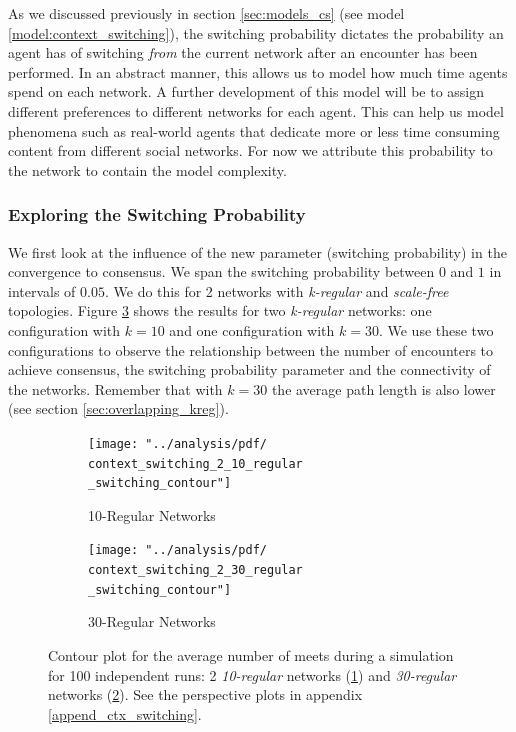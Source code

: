 \documentclass[preprint,number]{elsarticle}
\begin{document}
As we discussed previously in section \ref{sec:models_cs} (see model \ref{model:context_switching}), the switching probability dictates the probability an agent has of switching \textit{from} the current network after an encounter has been performed. In an abstract manner, this allows us to model how much time agents spend on each network. A further development of this model will be to assign different preferences to different networks for each agent. This can help us model phenomena such as real-world agents that dedicate more or less time consuming content from different social networks. For now we attribute this probability to the network to contain the model complexity.


\subsubsection{Exploring the Switching Probability}
We first look at the influence of the new parameter (switching probability) in the convergence to consensus. We span the switching probability between $0$ and $1$ in intervals of $0.05$. We do this for 2 networks with \textit{k-regular} and \textit{scale-free} topologies. Figure \ref{fig:ctx_cs_2_kregular} shows the results for two \textit{k-regular} networks: one configuration with $k = 10$ and one configuration with $k = 30$. We use these two configurations to observe the relationship between the number of encounters to achieve consensus, the switching probability parameter and the connectivity of the networks. Remember that with $k=30$ the average path length is also lower (see section \ref{sec:overlapping_kreg}). 

\begin{figure}[H]
	\centering
	\begin{subfigure}{0.49\linewidth}
		\centering
		\texttt{[image: "../analysis/pdf/  context\_switching\_2\_10\_regular \_switching\_contour"]}
		\caption{10-Regular Networks}
		\label{fig:ctx_cs_2_10kreg}
	\end{subfigure}%
	\begin{subfigure}{0.49\linewidth}
		\centering
		\texttt{[image: "../analysis/pdf/  context\_switching\_2\_30\_regular \_switching\_contour"]}
		\caption{30-Regular Networks}
		\label{fig:ctx_cs_2_30kreg}
	\end{subfigure}
	
	\begin{minipage}{0.9\linewidth}
		\vspace{0.2cm}
		\caption{Contour plot for the average number of meets during a simulation for 100 independent runs: 2 \textit{10-regular} networks (\ref{fig:ctx_cs_2_10kreg}) and \textit{30-regular} networks (\ref{fig:ctx_cs_2_30kreg}). See the perspective plots in appendix \ref{append_ctx_switching}.}
		\label{fig:ctx_cs_2_kregular}
	\end{minipage}
\end{figure}
\end{document}
